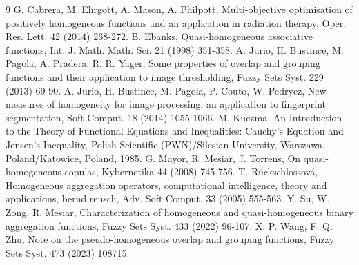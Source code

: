 \documentclass[12pt]{article}
\begin{document}
\begin{thebibliography}{9}
 G. Cabrera, M. Ehrgott, A. Mason, A. Philpott, Multi-objective optimisation of positively homogeneous functions and an application in radiation therapy, Oper. Res. Lett. 42 (2014) 268-272.
 B. Ebanks, Quasi-homogeneous associative functions, Int. J. Math. Math. Sci. 21 (1998) 351-358.
 A. Jurio, H. Bustince, M. Pagola, A. Pradera, R. R. Yager, Some properties of overlap and grouping functions and their application to image thresholding, Fuzzy Sets Syst. 229 (2013) 69-90.
 A. Jurio, H. Bustince, M. Pagola, P. Couto, W. Pedrycz, New measures of homogeneity for image processing: an application to fingerprint segmentation, Soft Comput. 18 (2014) 1055-1066.
 M. Kuczma, An Introduction to the Theory of Functional Equations and Inequalities: Cauchy's Equation and Jensen's Inequality, Polish Scientific (PWN)/Silesian University, Warszawa, Poland/Katowice, Poland, 1985.
 G. Mayor, R. Mesiar, J. Torrens, On quasi-homogeneous copulas, Kybernetika 44 (2008) 745-756.
 T. R\"{u}ckschlossov\'{a}, Homogeneous aggregation operators, computational intelligence, theory and applications, bernd reusch, Adv. Soft Comput. 33 (2005) 555-563.
 Y. Su, W. Zong, R. Mesiar, Characterization of homogeneous and quasi-homogeneous binary aggregation functions, Fuzzy Sets Syst. 433 (2022) 96-107.
 X. P. Wang, F. Q. Zhu, Note on the pseudo-homogeneous overlap and grouping functions, Fuzzy Sets Syst. 473 (2023) 108715.
\end{thebibliography}
\end{document}
